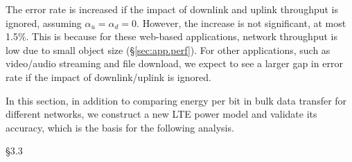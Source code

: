 The error rate is increased if the impact of downlink and uplink throughput is ignored, \ie assuming $\alpha_u = \alpha_d = 0$. However, the increase is not significant, at most 1.5\%. This is because for these web-based applications, network throughput is low due to small object size (\S\ref{sec:app.perf}). For other applications, such as video/audio streaming and file download, we expect to see a larger gap in error rate if the impact of downlink/uplink is ignored.

In this section, in addition to comparing energy per bit in bulk data transfer for different networks, we construct a new LTE power model and validate its accuracy, which is the basis for the following analysis.



\S3.3

